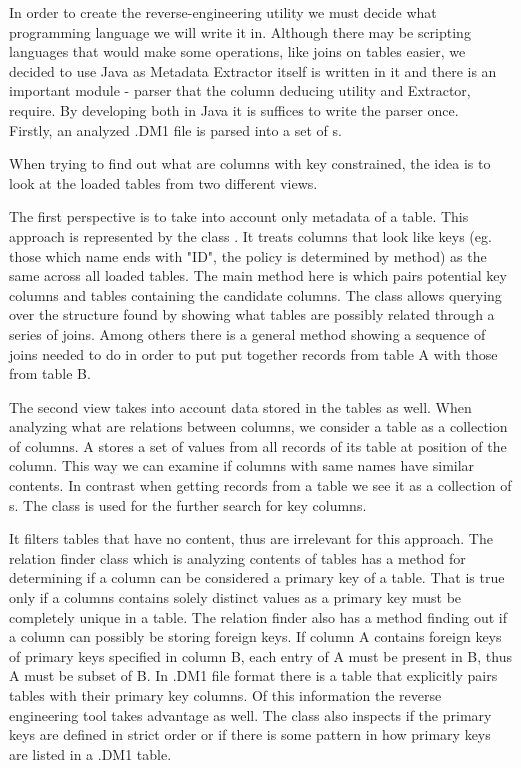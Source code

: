 In order to create the reverse-engineering utility we must decide what programming language we will write it in. Although there may be scripting languages that would make some operations, like joins on tables easier, we decided to use Java as Metadata Extractor itself is written in it and there is an important module - parser that the column deducing utility and Extractor, require. By developing both in Java it is suffices to write the parser once.\\

Firstly, an analyzed .DM1 file is parsed into a set of s.

When trying to find out what are columns with key constrained, the idea is to look at the loaded tables from two different views.

The first perspective is to take into account only metadata of a table. This approach is represented by the class . It treats columns that look like keys (eg. those which name ends with "ID", the policy is determined by  method) as the same across all loaded tables. 
The main method here is  which pairs potential key columns and tables containing the candidate columns.
The class  allows querying over the structure found by  showing what tables are possibly related through a series of joins.
Among others there is a general method  showing a sequence of joins needed to do in order to put put together records from table A with those from table B.

The second view takes into account data stored in the tables as well. 
When analyzing what are relations between columns, we consider a table as a collection of columns. A  stores a set of values from all records of its table at position of the column. 
This way we can examine if columns with same names have similar contents.
In contrast when getting records from a table we see it as a collection of s.
The  class is used for the further search for key columns.

It filters tables that have no content, thus are irrelevant for this approach.
The relation finder class which is analyzing contents of tables has a method for determining if a column can be considered a primary key of a table.  That is true only if a columns contains solely distinct values as a primary key must be completely unique in a table.
The relation finder also has a method finding out if a column can possibly be storing foreign keys. If column A contains foreign keys of primary keys specified in column B, each entry of A must be present in B, thus A must be subset of B.
In .DM1 file format there is a table  that explicitly pairs tables with their primary key columns. Of this information the reverse engineering tool takes advantage as well.
The class also inspects if the primary keys are defined in strict order or if there is some pattern in how primary keys are listed in a .DM1 table.

